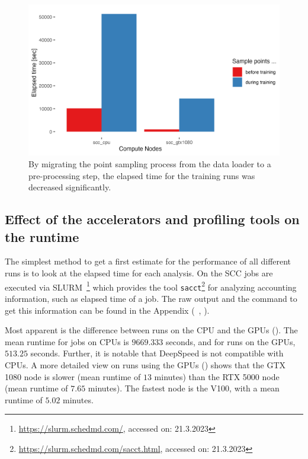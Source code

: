 \documentclass[12pt, a4paper, hidelinks]{article}
\begin{document}
\begin{figure}[H]
\centering
\includegraphics[width=1\textwidth]{./assets/sacct_barplot_by_nodes_sample-points-effect}
\vspace{-1em}
\caption[Effect of the data loading optimization]{By migrating the point sampling process from the data loader to a pre-processing step, the elapsed time for the training runs was decreased significantly.}
\label{fig:sacct_barplot_by_nodes_sample-points-effect}
\end{figure}

\subsection{Effect of the accelerators and profiling tools on the runtime}
\label{sec:r-runtime}

The simplest method to get a first estimate for the performance of all different runs is to look at the elapsed time for each analysis. On the \ac{SCC} jobs are executed via SLURM~\footnote{\url{https://slurm.schedmd.com/}, accessed on: 21.3.2023} which provides the tool \texttt{sacct}\footnote{\url{https://slurm.schedmd.com/sacct.html}, accessed on: 21.3.2023} for analyzing accounting information, such as elapsed time of a job. The raw output and the command to get this information can be found in the Appendix (~, ). 

Most apparent is the difference between runs on the \ac{CPU} and the \ac{GPU}s (). The mean runtime for jobs on \ac{CPU}s is $9669.333$ seconds, and for runs on the \ac{GPU}s, $513.25$ seconds. Further, it is notable that DeepSpeed is not compatible with \ac{CPU}s. A more detailed view on runs using the \ac{GPU}s () shows that the GTX 1080 node is slower (mean runtime of $13$ minutes) than the RTX 5000 node (mean runtime of $7.65$ minutes). The fastest node is the V100, with a mean runtime of $5.02$ minutes.
\end{document}
